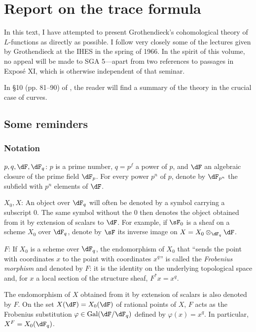 
\chapter{Report on the trace formula}\label{II}

In this text, I have attempted to present Grothendieck's cohomological theory
of $L$-functions as directly as possible. I follow very closely some of the
lectures given by Grothendieck at the IHES in the spring of 1966. In the
spirit of this volume, no appeal will be made to SGA 5---apart from two
references to passages in Exposé XI, which is otherwise independent of that
seminar.

In \S 10 (pp. 81--90) of \cite{de73}, the reader will find a summary of the
theory in the crucial case of curves.










\section{Some reminders}\label{II:1}





\subsection{Notation}\label{II:1-1}

$p,q,\dF,\dF_q$: $p$ is a prime number, $q=p^f$ a power of $p$, and $\dF$
an algebraic closure of the prime field $\dF_p$. For every power $p^n$ of
$p$, denote by $\dF_{p^n}$ the subfield with $p^n$ elements of $\dF$.

$X_0,X$: An object over $\dF_q$ will often be denoted by a symbol carrying a
subscript $0$. The same symbol without the $0$ then denotes the object
obtained from it by extension of scalars to $\dF$. For example, if $\sF_0$ is
a sheaf on a scheme $X_0$ over $\dF_q$, denote by $\sF$ its inverse image on
$X=X_0\otimes_{\dF_q} \dF$.

$F$: If $X_0$ is a scheme over $\dF_q$, the endomorphism of $X_0$ that
``sends the point with coordinates $x$ to the point with coordinates $x^q$''
is called the \emph{Frobenius morphism} and denoted by $F$: it is the identity
on the underlying topological space and, for $x$ a local section of the
structure sheaf, $F^* x = x^q$.

The endomorphism of $X$ obtained from it by extension of scalars is also
denoted by $F$. On the set $X(\dF) = X_0(\dF)$ of rational points of $X$,
$F$ acts as the Frobenius substitution
$\varphi\in\gal(\dF/\dF_q)$ defined by $\varphi(x)=x^q$. In particular,
$X^F=X_0(\dF_q)$.

